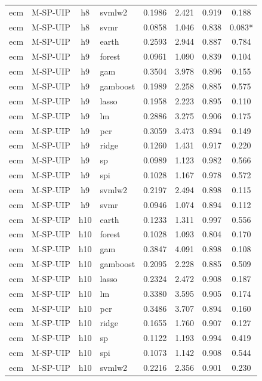 \begin{ThreePartTable}
\begin{longtable}[t]{llclcccc}
ecm & M-SP-UIP & h8 & svmlw2 & 0.1986 & 2.421 & 0.919 & 0.188\\
ecm & M-SP-UIP & h8 & svmr & 0.0858 & 1.046 & 0.838 & 0.083*\\
\addlinespace
ecm & M-SP-UIP & h9 & earth & 0.2593 & 2.944 & 0.887 & 0.784\\
ecm & M-SP-UIP & h9 & forest & 0.0961 & 1.090 & 0.839 & 0.104\\
ecm & M-SP-UIP & h9 & gam & 0.3504 & 3.978 & 0.896 & 0.155\\
ecm & M-SP-UIP & h9 & gamboost & 0.1989 & 2.258 & 0.885 & 0.575\\
ecm & M-SP-UIP & h9 & lasso & 0.1958 & 2.223 & 0.895 & 0.110\\
ecm & M-SP-UIP & h9 & lm & 0.2886 & 3.275 & 0.906 & 0.175\\
ecm & M-SP-UIP & h9 & pcr & 0.3059 & 3.473 & 0.894 & 0.149\\
ecm & M-SP-UIP & h9 & ridge & 0.1260 & 1.431 & 0.917 & 0.220\\
ecm & M-SP-UIP & h9 & sp & 0.0989 & 1.123 & 0.982 & 0.566\\
ecm & M-SP-UIP & h9 & spi & 0.1028 & 1.167 & 0.978 & 0.572\\
ecm & M-SP-UIP & h9 & svmlw2 & 0.2197 & 2.494 & 0.898 & 0.115\\
ecm & M-SP-UIP & h9 & svmr & 0.0946 & 1.074 & 0.894 & 0.112\\
\addlinespace
ecm & M-SP-UIP & h10 & earth & 0.1233 & 1.311 & 0.997 & 0.556\\
ecm & M-SP-UIP & h10 & forest & 0.1028 & 1.093 & 0.804 & 0.170\\
ecm & M-SP-UIP & h10 & gam & 0.3847 & 4.091 & 0.898 & 0.108\\
ecm & M-SP-UIP & h10 & gamboost & 0.2095 & 2.228 & 0.885 & 0.509\\
ecm & M-SP-UIP & h10 & lasso & 0.2324 & 2.472 & 0.908 & 0.187\\
ecm & M-SP-UIP & h10 & lm & 0.3380 & 3.595 & 0.905 & 0.174\\
ecm & M-SP-UIP & h10 & pcr & 0.3486 & 3.707 & 0.894 & 0.160\\
ecm & M-SP-UIP & h10 & ridge & 0.1655 & 1.760 & 0.907 & 0.127\\
ecm & M-SP-UIP & h10 & sp & 0.1122 & 1.193 & 0.994 & 0.419\\
ecm & M-SP-UIP & h10 & spi & 0.1073 & 1.142 & 0.908 & 0.544\\
ecm & M-SP-UIP & h10 & svmlw2 & 0.2216 & 2.356 & 0.901 & 0.230\\

\end{longtable}
\end{ThreePartTable}
